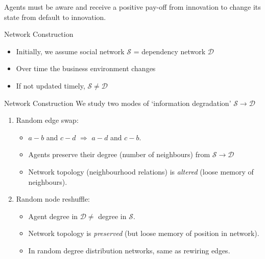\documentclass[10pt, xcolor=dvipsnames, handout]{beamer}
\begin{document}
\begin{frame}[standout]
Agents must be aware and receive a positive pay-off from innovation to change its state from default to innovation.
\end{frame}

\begin{frame}{Network Construction}
\begin{itemize}
\pause \item Initially, we assume social network $\mathcal{S}$ = dependency network $\mathcal{D}$
\pause \item Over time the business environment changes
\pause \item If not updated timely, $\mathcal{S}\neq \mathcal{D}$
\end{itemize}
\end{frame}
\begin{frame}{Network Construction}
\pause We study two modes of `information degradation' $\mathcal{S}\to \mathcal{D}$ \cite{brummitt_multiplexity-facilitated_2012}
\begin{enumerate}
\pause \item Random edge swap:
  \begin{itemize}
  \pause \item $a-b$ and $c- d$ $\Rightarrow$ $a -d$ and $c- b$.
  \pause \item Agents preserve their degree (number of neighbours) from $\mathcal{S} \to \mathcal{D}$
  \pause \item Network topology (neighbourhood relations) is \emph{altered} (loose memory of neighbours).
  \end{itemize}
\pause \item Random node reshuffle:
\begin{itemize}
\pause \item Agent degree in $\mathcal{D} \neq$ degree in $\mathcal{S}$.
\pause \item Network topology is \emph{preserved} (but loose memory of position in network).
\pause \item In random degree distribution networks, same as rewiring edges.
\end{itemize}
\end{enumerate}
\end{frame}
\end{document}
